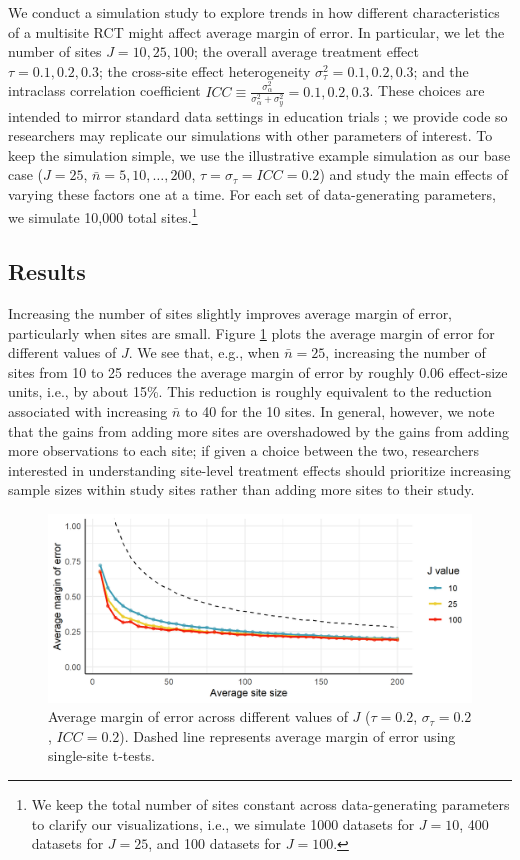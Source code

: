 \documentclass[]{article}
\begin{document}
We conduct a simulation study to explore trends in how different characteristics of a multisite RCT might affect average margin of error.
In particular, we let the number of sites $J = 10, 25, 100$; the overall average treatment effect $\tau = 0.1, 0.2, 0.3$; the cross-site effect heterogeneity $\sigma^2_\tau = 0.1, 0.2, 0.3$; and the intraclass correlation coefficient $ICC \equiv \frac{\sigma^2_\alpha}{\sigma^2_\alpha + \sigma^2_y} = 0.1, 0.2, 0.3$.
These choices are intended to mirror standard data settings in education trials \citep{weiss2017much};
we provide code so researchers may replicate our simulations with other parameters of interest.
To keep the simulation simple, we use the illustrative example simulation as our base case ($J=25$, $\bar{n}=5,10,\dots,200$, $\tau=\sigma_\tau=ICC=0.2$) and study the main effects of varying these factors one at a time.
For each set of data-generating parameters, we simulate 10,000 total sites.\footnote{We keep the total number of sites constant across data-generating parameters to clarify our visualizations, i.e., we simulate 1000 datasets for $J=10$, 400 datasets for $J=25$, and 100 datasets for $J=100$.}

\subsection{Results}

Increasing the number of sites slightly improves average margin of error, particularly when sites are small.
Figure \ref{fig:results_J} plots the average margin of error for different values of $J$.
We see that, e.g., when $\bar{n}=25$, increasing the number of sites from 10 to 25 reduces the average margin of error by roughly 0.06 effect-size units, i.e., by about 15\%.
This reduction is roughly equivalent to the reduction associated with increasing $\bar{n}$ to 40 for the 10 sites.
In general, however, we note that the gains from adding more sites are overshadowed by the gains from adding more observations to each site;
if given a choice between the two, researchers interested in understanding site-level treatment effects should prioritize increasing sample sizes within study sites rather than adding more sites to their study.
\begin{figure}[ht]
	\centering
	\includegraphics[width=\textwidth]{simstudy_J_length}
	\caption{Average margin of error across different values of $J$ ($\tau=0.2$, $\sigma_\tau=0.2$, $ICC=0.2$).
	    Dashed line represents average margin of error using single-site t-tests.}
	\label{fig:results_J}
\end{figure}
\end{document}
